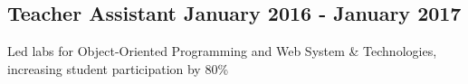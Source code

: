 \subsection{{Teacher Assistant \hfill January 2016 - January 2017}}
\begin{zitemize}

\item Led labs for Object-Oriented Programming and Web System \& Technologies, increasing student participation by 80\%

    
\end{zitemize}
